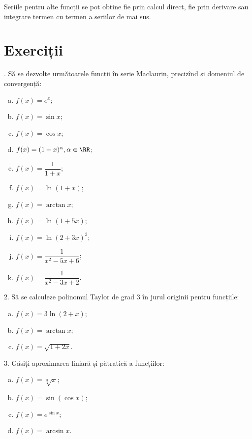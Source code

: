 Seriile pentru alte funcții se pot obține fie prin calcul direct, fie
prin derivare sau integrare termen cu termen a seriilor de mai sus.

\section{Exerciții}

\indent{}. Să se dezvolte următoarele funcții în serie Maclaurin, precizînd și
domeniul de convergență:
\begin{enumerate}[(a)]
    \item $ f(x) = e^x $;
    \item $ f(x) = \sin x $;
    \item $ f(x) = \cos x $;
    \item $ f(x) = (1 + x)^\alpha, \alpha \in \RR $;
    \item $ f(x) = \dfrac{1}{1 + x} $;
    \item $ f(x) = \ln(1 + x) $;
    \item $ f(x) = \arctan x $;
    \item $ f(x) = \ln(1 + 5x)$;
    \item $ f(x) = \ln(2 + 3x)^3 $;
    \item $ f(x) = \dfrac{1}{x^2 - 5x + 6} $;
    \item $ f(x) = \dfrac{1}{x^2 - 3x + 2} $.
\end{enumerate}

\vspace{0.5cm}

2. Să se calculeze polinomul Taylor de grad 3 în jurul originii
pentru funcțiile:
\begin{enumerate}[(a)]
\item $ f(x) = 3 \ln(2 + x) $;
\item $ f(x) = \arctan x $;
\item $ f(x) = \sqrt{1 + 2x} $.
\end{enumerate}

\vspace{0.5cm}

3. Găsiți aproximarea liniară și pătratică a funcțiilor:
\begin{enumerate}[(a)]
\item $ f(x) = \sqrt[3]{x} $;
\item $ f(x) = \sin(\cos x) $;
\item $ f(x) = e^{\sin x} $;
\item $ f(x) = \arcsin x $.
\end{enumerate}

